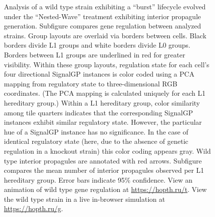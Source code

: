 \begin{figure}[!htbp]
\begin{center}
\caption{
Analysis of a wild type strain exhibiting a ``burst'' lifecycle evolved under the ``Nested-Wave'' treatment exhibiting interior propagule generation.
Subfigure  compares gene regulation between analyzed strains.
Group layouts are overlaid via borders between cells.
Black borders divide L1 groups and white borders divide L0 groups.
Borders between L1 groups are underlined in red for greater visibility.
Within these group layouts, regulation state for each cell's four directional SignalGP instances is color coded using a PCA mapping from regulatory state to three-dimensional RGB coordinates.
(The PCA mapping is calculated uniquely for each L1 hereditary group.)
Within a L1 hereditary group, color similarity among tile quarters indicates that the corresponding SignalGP instances exhibit similar regulatory state.
However, the particular hue of a SignalGP instance has no significance.
In the case of identical regulatory state (here, due to the absence of genetic regulation in a knockout strain) this color coding appears gray.
Wild type interior propagules are annotated with red arrows.
Subfigure  compares the mean number of interior propagules observed per L1 hereditary group.
Error bars indicate 95\% confidence.
View an animation of wild type gene regulation at \url{https://hopth.ru/t}.
View the wild type strain in a live in-browser simulation at \url{https://hopth.ru/g}.
}
\label{fig:ko-interior_propagule}
\end{center}
\end{figure}
